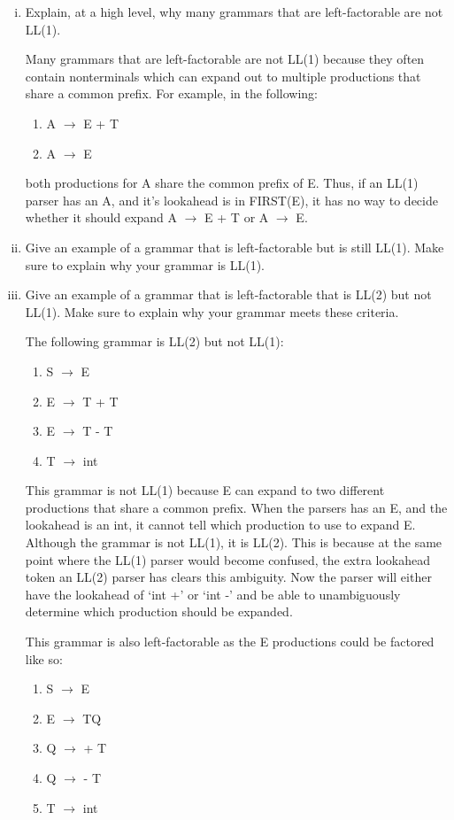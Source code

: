 \documentclass{article}
\begin{document}
\begin{enumerate}[i.]
	\item Explain, at a high level, why many grammars that are
		left-factorable are not LL(1).

		Many grammars that are left-factorable are not LL(1) because
		they often contain nonterminals which can expand out to multiple
		productions that share a common prefix. For example, in the
		following:
		\begin{enumerate}[(1)]
			\item A $\to$ E + T
			\item A $\to$ E
		\end{enumerate}
		both productions for A share the common prefix of E. Thus, if
		an LL(1) parser has an A, and it's lookahead is in FIRST(E),
		it has no way to decide whether it should expand A $\to$ E + T
		or A $\to$ E.

	\item Give an example of a grammar that is left-factorable but is still
		LL(1). Make sure to explain why your grammar is LL(1).


	\item Give an example of a grammar that is left-factorable that is
		LL(2) but not LL(1). Make sure to explain why your grammar
		meets these criteria.

		The following grammar is LL(2) but not LL(1):
		\begin{enumerate}[(1)]
			\item S $\to$ E
			\item E $\to$ T + T
			\item E $\to$ T - T
			\item T $\to$ int
		\end{enumerate}
		This grammar is not LL(1) because E can expand to two different
		productions that share a common prefix. When the parsers has an
		E, and the lookahead is an int, it cannot tell which production
		to use to expand E. Although the grammar is not LL(1), it is
		LL(2). This is because at the same point where the LL(1) parser
		would become confused, the extra lookahead token an LL(2)
		parser has clears this ambiguity. Now the parser will either
		have the lookahead of `int +' or `int -' and be able to
		unambiguously determine which production should be expanded.

		This grammar is also left-factorable as the E productions could
		be factored like so:
		\begin{enumerate}[(1)]
			\item S $\to$ E
			\item E $\to$ TQ
			\item Q $\to$ + T
			\item Q $\to$ - T
			\item T $\to$ int
		\end{enumerate}
\end{enumerate}
\end{document}
